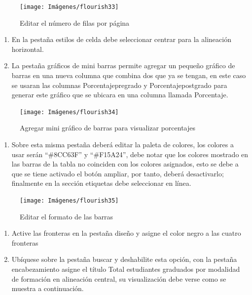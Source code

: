 \documentclass[
]{book}
\providecommand{\tightlist}{%
  \setlength{\itemsep}{0pt}\setlength{\parskip}{0pt}}
\begin{document}
\begin{figure}

{\centering \texttt{[image: Imágenes/flourish33]} 

}

\caption{Editar el número de filas por página}\label{fig:paso5tablatextoflourish-fig}
\end{figure}

\begin{enumerate}
\def\labelenumi{\arabic{enumi}.}
\setcounter{enumi}{5}
\item
  En la pestaña estilos de celda debe seleccionar centrar para la alineación horizontal.
\item
  La pestaña gráficos de mini barras permite agregar un pequeño gráfico de barras en una nueva columna que combina dos que ya se tengan, en este caso se usaran las columnas Porcentajepregrado y Porcentajepostgrado para generar este gráfico que se ubicara en una columna llamada Porcentaje.
\end{enumerate}

\begin{figure}

{\centering \texttt{[image: Imágenes/flourish34]} 

}

\caption{Agregar mini gráfico de barras para visualizar porcentajes}\label{fig:paso7tablatextoflourish-fig}
\end{figure}

\begin{enumerate}
\def\labelenumi{\arabic{enumi}.}
\setcounter{enumi}{7}
\tightlist
\item
  Sobre esta misma pestaña deberá editar la paleta de colores, los colores a usar serán ``\#8CC63F'' y ``\#F15A24'', debe notar que los colores mostrado en las barras de la tabla no coinciden con los colores asignados, esto se debe a que se tiene activado el botón ampliar, por tanto, deberá desactivarlo; finalmente en la sección etiquetas debe seleccionar en línea.
\end{enumerate}

\begin{figure}

{\centering \texttt{[image: Imágenes/flourish35]} 

}

\caption{Editar el formato de las barras}\label{fig:paso8tablatextoflourish-fig}
\end{figure}

\begin{enumerate}
\def\labelenumi{\arabic{enumi}.}
\setcounter{enumi}{8}
\item
  Active las fronteras en la pestaña diseño y asigne el color negro a las cuatro fronteras
\item
  Ubíquese sobre la pestaña buscar y deshabilite esta opción, con la pestaña encabezamiento asigne el título Total estudiantes graduados por modalidad de formación en alineación central, su visualización debe verse como se muestra a continuación.
\end{enumerate}
\end{document}
